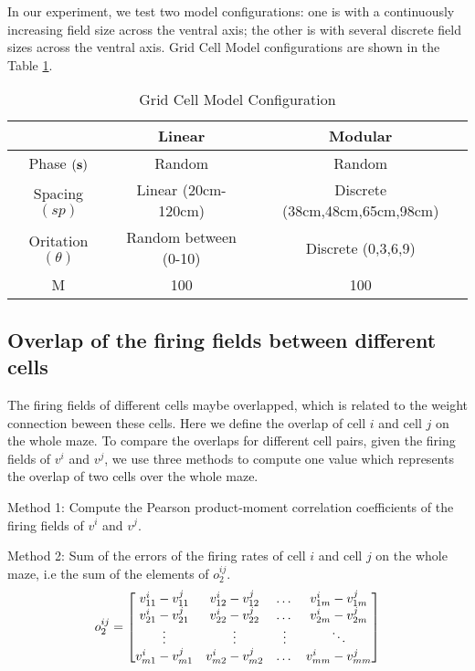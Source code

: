 \documentclass[11pt, letterpaper, onecolumn]{article}
\newcommand{\sv}{{\bf s}}
\begin{document}
In our experiment, we test two model configurations: one is with a continuously increasing field size across the ventral axis; the other is with several discrete field sizes across the ventral axis. Grid Cell Model configurations are shown in the Table \ref{lb:grid}.
\begin{table}[h]
\centering
\caption{Grid Cell Model Configuration}
\label{lb:grid}
\begin{tabular}{c|c|c}
\hline
       & Linear      & Modular  \\ \hline
       Phase $(\sv)$ & Random      & Random  \\ \hline
       Spacing $(sp)$ & Linear (20cm-120cm)  &  Discrete (38cm,48cm,65cm,98cm) \\ \hline
       Oritation $(\theta)$ & Random between (0-10)    & Discrete (0,3,6,9)     \\ \hline
       M & 100 & 100      \\ \hline
\end{tabular}
\end{table}

\subsection{Overlap of the firing fields between different cells}
The firing fields of different cells maybe overlapped, which is related to the weight connection beween these cells. Here we define the overlap of cell $i$ and cell $j$ on the whole maze. To compare the overlaps for different cell pairs, given the firing fields of $v^i$ and $v^j$, we use three methods to compute one value which represents the overlap of two cells over the whole maze.

Method 1: Compute the Pearson product-moment correlation coefficients of the firing fields of $v^i$ and $v^j$.

Method 2: Sum of the errors of the firing rates of cell $i$ and cell $j$ on the whole maze, i.e the sum of the elements of $o_2^{ij}$.
\[
    o_2^{ij} \\
    = 
\begin{bmatrix}
    v^{i}_{11}-v^{j}_{11} & v^{i}_{12}-v^{j}_{12} & \dots  & v^{i}_{1m}-v^{j}_{1m} \\
    v^{i}_{21}-v^{j}_{21} & v^{i}_{22}-v^{j}_{22} & \dots  & v^{i}_{2m}-v^{j}_{2m} \\
    \vdots & \vdots & \vdots & \ddots \\
    v^{i}_{m1}-v^{j}_{m1} & v^{i}_{m2}-v^{j}_{m2} & \dots  & v^{i}_{mm}-v^{j}_{mm} \\
\end{bmatrix}
\] \\
\end{document}
